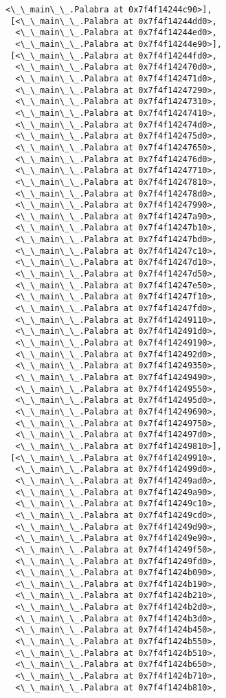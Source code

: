 \documentclass[12pt,a4paper,table]{article}
\begin{document}
\begin{tcolorbox}[breakable, size=fbox, boxrule=.5pt, pad at break*=1mm, opacityfill=0]
\begin{Verbatim}[commandchars=\\\{\}]
  <\_\_main\_\_.Palabra at 0x7f4f14244c90>],
 [<\_\_main\_\_.Palabra at 0x7f4f14244dd0>,
  <\_\_main\_\_.Palabra at 0x7f4f14244ed0>,
  <\_\_main\_\_.Palabra at 0x7f4f14244e90>],
 [<\_\_main\_\_.Palabra at 0x7f4f14244fd0>,
  <\_\_main\_\_.Palabra at 0x7f4f142470d0>,
  <\_\_main\_\_.Palabra at 0x7f4f142471d0>,
  <\_\_main\_\_.Palabra at 0x7f4f14247290>,
  <\_\_main\_\_.Palabra at 0x7f4f14247310>,
  <\_\_main\_\_.Palabra at 0x7f4f14247410>,
  <\_\_main\_\_.Palabra at 0x7f4f142474d0>,
  <\_\_main\_\_.Palabra at 0x7f4f142475d0>,
  <\_\_main\_\_.Palabra at 0x7f4f14247650>,
  <\_\_main\_\_.Palabra at 0x7f4f142476d0>,
  <\_\_main\_\_.Palabra at 0x7f4f14247710>,
  <\_\_main\_\_.Palabra at 0x7f4f14247810>,
  <\_\_main\_\_.Palabra at 0x7f4f142478d0>,
  <\_\_main\_\_.Palabra at 0x7f4f14247990>,
  <\_\_main\_\_.Palabra at 0x7f4f14247a90>,
  <\_\_main\_\_.Palabra at 0x7f4f14247b10>,
  <\_\_main\_\_.Palabra at 0x7f4f14247bd0>,
  <\_\_main\_\_.Palabra at 0x7f4f14247c10>,
  <\_\_main\_\_.Palabra at 0x7f4f14247d10>,
  <\_\_main\_\_.Palabra at 0x7f4f14247d50>,
  <\_\_main\_\_.Palabra at 0x7f4f14247e50>,
  <\_\_main\_\_.Palabra at 0x7f4f14247f10>,
  <\_\_main\_\_.Palabra at 0x7f4f14247fd0>,
  <\_\_main\_\_.Palabra at 0x7f4f14249110>,
  <\_\_main\_\_.Palabra at 0x7f4f142491d0>,
  <\_\_main\_\_.Palabra at 0x7f4f14249190>,
  <\_\_main\_\_.Palabra at 0x7f4f142492d0>,
  <\_\_main\_\_.Palabra at 0x7f4f14249350>,
  <\_\_main\_\_.Palabra at 0x7f4f14249490>,
  <\_\_main\_\_.Palabra at 0x7f4f14249550>,
  <\_\_main\_\_.Palabra at 0x7f4f142495d0>,
  <\_\_main\_\_.Palabra at 0x7f4f14249690>,
  <\_\_main\_\_.Palabra at 0x7f4f14249750>,
  <\_\_main\_\_.Palabra at 0x7f4f142497d0>,
  <\_\_main\_\_.Palabra at 0x7f4f14249810>],
 [<\_\_main\_\_.Palabra at 0x7f4f14249910>,
  <\_\_main\_\_.Palabra at 0x7f4f142499d0>,
  <\_\_main\_\_.Palabra at 0x7f4f14249ad0>,
  <\_\_main\_\_.Palabra at 0x7f4f14249a90>,
  <\_\_main\_\_.Palabra at 0x7f4f14249c10>,
  <\_\_main\_\_.Palabra at 0x7f4f14249cd0>,
  <\_\_main\_\_.Palabra at 0x7f4f14249d90>,
  <\_\_main\_\_.Palabra at 0x7f4f14249e90>,
  <\_\_main\_\_.Palabra at 0x7f4f14249f50>,
  <\_\_main\_\_.Palabra at 0x7f4f14249fd0>,
  <\_\_main\_\_.Palabra at 0x7f4f1424b090>,
  <\_\_main\_\_.Palabra at 0x7f4f1424b190>,
  <\_\_main\_\_.Palabra at 0x7f4f1424b210>,
  <\_\_main\_\_.Palabra at 0x7f4f1424b2d0>,
  <\_\_main\_\_.Palabra at 0x7f4f1424b3d0>,
  <\_\_main\_\_.Palabra at 0x7f4f1424b450>,
  <\_\_main\_\_.Palabra at 0x7f4f1424b550>,
  <\_\_main\_\_.Palabra at 0x7f4f1424b510>,
  <\_\_main\_\_.Palabra at 0x7f4f1424b650>,
  <\_\_main\_\_.Palabra at 0x7f4f1424b710>,
  <\_\_main\_\_.Palabra at 0x7f4f1424b810>,

\end{Verbatim}
\end{tcolorbox}
\end{document}
